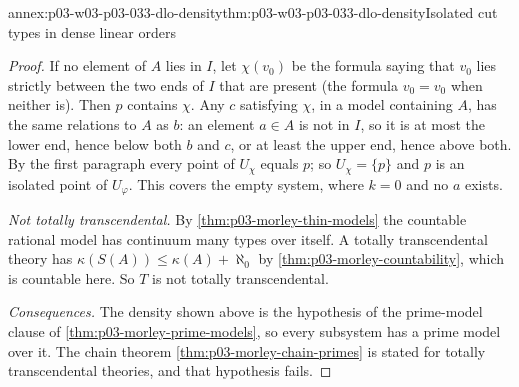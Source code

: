 \begin{annexitem}{annex:p03-w03-p03-033-dlo-density}{thm:p03-w03-p03-033-dlo-density}{Isolated cut types in dense linear orders}
\begin{proof}
If no element of \(A\) lies in \(I\), let \(\chi(v_0)\) be the formula
saying that \(v_0\) lies strictly between the two ends of \(I\) that are
present (the formula \(v_0=v_0\) when neither is). Then \(p\) contains
\(\chi\). Any \(c\) satisfying \(\chi\), in a model containing \(A\), has
the same relations to \(A\) as \(b\): an element \(a\in A\) is not in
\(I\), so it is at most the lower end, hence below both \(b\) and \(c\),
or at least the upper end, hence above both. By the first paragraph
every point of \(U_\chi\) equals \(p\); so \(U_\chi=\{p\}\) and \(p\) is an
isolated point of \(U_\varphi\). This covers the empty system, where
\(k=0\) and no \(a\) exists.

\emph{Not totally transcendental.} By \cref{thm:p03-morley-thin-models}
the countable rational model has continuum many types over itself. A
totally transcendental theory has
\(\kappa(S(A))\leq\kappa(A)+\aleph_0\) by
\cref{thm:p03-morley-countability}, which is countable here. So \(T\) is
not totally transcendental.

\emph{Consequences.} The density shown above is the hypothesis of the
prime-model clause of \cref{thm:p03-morley-prime-models}, so every
subsystem has a prime model over it. The chain theorem
\cref{thm:p03-morley-chain-primes} is stated for totally transcendental
theories, and that hypothesis fails.
\end{proof}
\end{annexitem}

